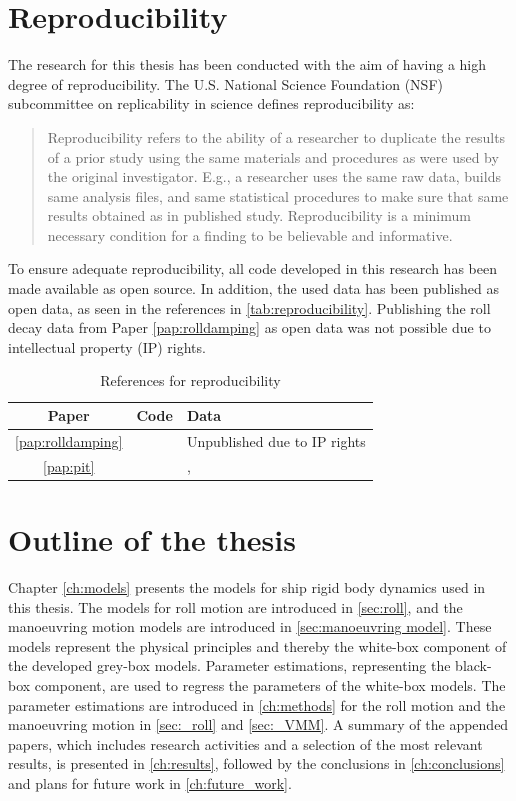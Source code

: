 \section{Reproducibility}
The research for this thesis has been conducted with the aim of having a high degree of reproducibility. The U.S. National Science Foundation (NSF) subcommittee on replicability in science defines reproducibility as:
\begin{quote}
Reproducibility refers to the ability of a researcher to duplicate the results of a prior study
using the same materials and procedures as were used by the original
investigator. 
E.g., a researcher uses the same raw data, builds same analysis files,
and same statistical procedures to make sure that same results
obtained as in published study. Reproducibility is a minimum necessary condition for a finding to be
believable and informative. 
    \cite{bollen_reproducibility_2015}
\end{quote}

\noindent To ensure adequate reproducibility, all code developed in this research has been made available as open source. In addition, the used data has been published as open data, as seen in the references in \autoref{tab:reproducibility}. Publishing the roll decay data from Paper \ref{pap:rolldamping} as open data was not possible due to intellectual property (IP) rights.

\begin{table}[H]
    \centering
    \caption{References for reproducibility}
    \label{tab:reproducibility}
    \begin{tabular}{|c|l|l|}
        \hline
         Paper &  Code & Data \\
         \hline
         \ref{pap:rolldamping} & \textcite{alexandersson_martinlarsalbertrolldecay-estimators_2020} & Unpublished due to IP rights\\
         \ref{pap:pit} & \textcite{alexandersson_code_2022} & \textcite{alexandersson_wpcc_2022}, \textcite{stern_experience_2011} \\
         \hline
    \end{tabular}
\end{table}

\section{Outline of the thesis}
Chapter \ref{ch:models} presents the models for ship rigid body dynamics used in this thesis. The models for roll motion are introduced in \autoref{sec:roll}, and the manoeuvring motion models are introduced in  \autoref{sec:manoeuvring model}. These models represent the physical principles and thereby the white-box component of the developed grey-box models.
Parameter estimations, representing the black-box component, are used to regress the parameters of the white-box models. The parameter estimations are introduced in \autoref{ch:methods} for the roll motion and the manoeuvring motion in \autoref{sec:_roll} and \autoref{sec:_VMM}. 
A summary of the appended papers, which includes research activities and a selection of the most relevant results, is presented in \autoref{ch:results}, followed by the conclusions in \autoref{ch:conclusions} and plans for future work in \autoref{ch:future_work}.